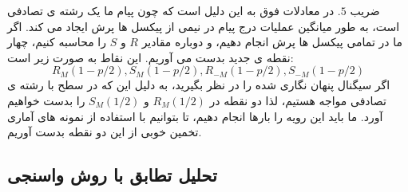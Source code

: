 ضریب $ .5 $ در معادلات فوق به این دلیل است که چون پیام ما یک رشته ی تصادفی است، به طور میانگین عملیات درج پیام در نیمی از پیکسل ها پرش ایجاد می کند. اگر ما در {} تمامی پیکسل ها پرش انجام دهیم، و دوباره مقادیر $ R $ و $ S $ را محاسبه کنیم، چهار نقطه ی جدید بدست می آوریم. این نقاط به صورت زیر است:
\begin{equation}
R_{M}(1-p/2),S_{M}(1-p/2),R_{-M}(1-p/2),S_{-M}(1-p/2)
\end{equation}
اگر سیگنال پنهان نگاری شده را در نظر بگیرید، به دلیل این که در سطح {} با رشته ی تصادفی مواجه هستیم، لذا دو نقطه در
 {$ R_{M}(1/2) $} و {$ S_{M}(1/2) $} را بدست خواهیم آورد. ما باید این رویه را بارها انجام دهیم، تا بتوانیم با استفاده از نمونه های آماری تخمین خوبی از این دو نقطه بدست آوریم.
\subsection{
تحلیل تطابق {} با روش واسنجی}

